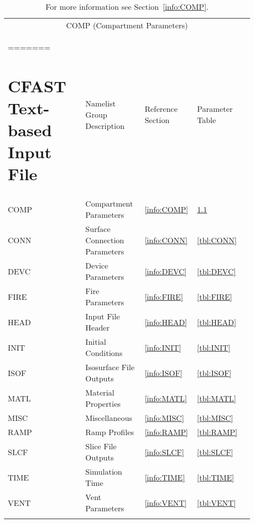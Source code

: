 \vspace{\baselineskip}

\begin{longtable}{@{\extracolsep{\fill}}|l|l|l|l|l|}
\caption[Boundary file parameters ({\ct COMP} namelist group)]{For more information see Section~\ref{info:COMP}.}
\label{tbl:COMP} \\
\hline
\multicolumn{5}{|c|}{{\ct COMP} (Compartment Parameters)} \\
=======
\chapter{CFAST Text-based Input File}

\begin{table}[ht]
\begin{center}
\caption{CFAST Input File Keywords}
\label{tbl:namelistgroups}
\begin{tabular}{|c|l|c|c|}
\hline
Group Name  & Namelist Group Description& Reference Section & Parameter Table  \\ \hline
{\ct COMP}   & Compartment Parameters         & \ref{info:COMP} & \ref{tbl:COMP}  \\ \hline
{\ct CONN}   & Surface Connection Parameters          & \ref{info:CONN} & \ref{tbl:CONN}  \\ \hline
{\ct DEVC}    & Device Parameters          & \ref{info:DEVC} & \ref{tbl:DEVC}  \\ \hline
{\ct FIRE}     & Fire Parameters  & \ref{info:FIRE} & \ref{tbl:FIRE}  \\ \hline
{\ct HEAD}    & Input File Header            & \ref{info:HEAD} & \ref{tbl:HEAD}  \\ \hline
{\ct INIT}      & Initial Conditions            & \ref{info:INIT} & \ref{tbl:INIT}  \\ \hline
{\ct ISOF}     & Isosurface File Outputs            & \ref{info:ISOF} & \ref{tbl:ISOF}  \\ \hline
{\ct MATL}    & Material Properties           & \ref{info:MATL} & \ref{tbl:MATL}  \\ \hline
{\ct MISC}     & Miscellaneous    & \ref{info:MISC} & \ref{tbl:MISC}  \\ \hline
{\ct RAMP}    & Ramp Profiles            & \ref{info:RAMP} & \ref{tbl:RAMP}  \\ \hline
{\ct SLCF}     & Slice File Outputs       & \ref{info:SLCF} & \ref{tbl:SLCF}  \\ \hline
{\ct TIME}     & Simulation Time            & \ref{info:TIME} & \ref{tbl:TIME}  \\ \hline
{\ct VENT}     & Vent Parameters              & \ref{info:VENT} & \ref{tbl:VENT}  \\ \hline
\end{tabular}
\end{center}
\end{table}


\end{longtable}
